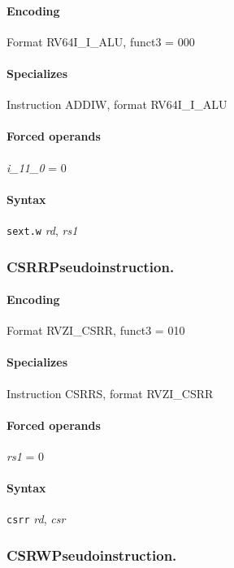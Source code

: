 {\paragraph{Encoding} Format \textsf{RV64I\_I\_ALU, funct3 = 000}\\



\paragraph{Specializes} Instruction ADDIW, format RV64I\_I\_ALU

\paragraph{Forced operands} \emph{i\_11\_0} = 0

\paragraph{Syntax} \texttt{sext.w} \emph{rd}, \emph{rs1}
\newpage
\subsubsection[{\small CSRR: Pseudoinstruction.}]{CSRR\hfill Pseudoinstruction.}
\label{instr:CSRR}

\paragraph{Encoding} Format \textsf{RVZI\_CSRR, funct3 = 010}\\



\paragraph{Specializes} Instruction CSRRS, format RVZI\_CSRR

\paragraph{Forced operands} \emph{rs1} = 0

\paragraph{Syntax} \texttt{csrr} \emph{rd}, \emph{csr}
\newpage
\subsubsection[{\small CSRW: Pseudoinstruction.}]{CSRW\hfill Pseudoinstruction.}
\label{instr:CSRW}

}

